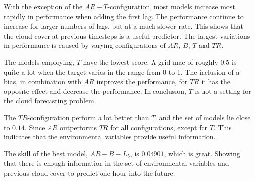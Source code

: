 With the exception of the $AR-T$-configuration, most models increase most rapidly in performance when adding the first lag. The performance continue to increase for larger numbers of lags, but at a much slower rate. This shows that the cloud cover at previous timesteps is a useful predictor. The largest variations in performance is caused by varying configurations of $AR$, $B$, $T$ and $TR$. 

The models employing, $T$ have the lowest score. A grid \acrshort{mae} of roughly $0.5$ is quite a lot when the target varies in the range from 0 to 1. The inclusion of a bias, in combination with $AR$ improves the performance, for $TR$ it has the opposite effect and decrease the performance. In conclusion, $T$ is not a setting for the cloud forecasting problem.


The $TR$-configuration perform a lot better than $T$, and the set of models lie close to $0.14$. Since $AR$ outperforms $TR$ for all configurations, except for $T$. This indicates that the environmental variables provide useful information.

The skill of the best model, $AR-B-L_5$, is $0.04901$, which is great.
Showing that there is enough information in the set of environmental variables and previous cloud cover to predict one hour into the future.
